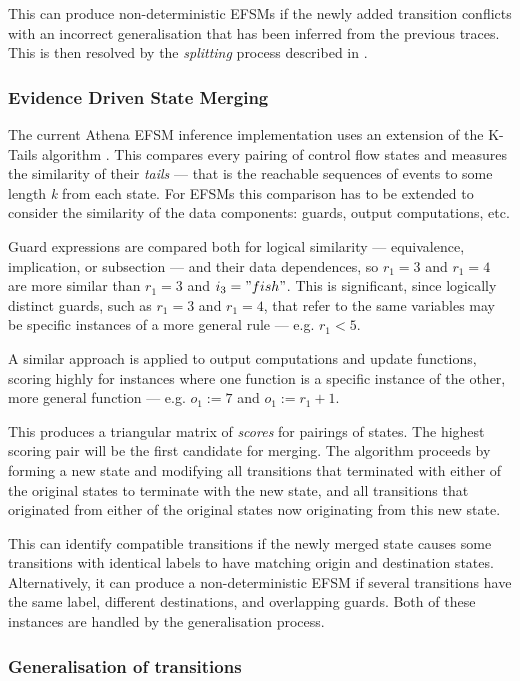 This can produce non-deterministic EFSMs if the newly added transition conflicts with an incorrect generalisation that has been inferred from the previous traces. This is then resolved by the \emph{splitting} process described in .

\subsubsection{Evidence Driven State Merging}
\label{EDSM}

The current Athena EFSM inference implementation uses an extension of the K-Tails algorithm \cite{}. This compares every pairing of control flow states and measures the similarity of their \emph{tails} --- that is the reachable sequences of events to some length \emph{k} from each state. For EFSMs this comparison has to be extended to consider the similarity of the data components: guards, output computations, etc. 

Guard expressions are compared both for logical similarity --- equivalence, implication, or subsection --- and their data dependences, so $r_1 = 3$ and $r_1 = 4$ are more similar than $r_1 = 3$ and $i_3 = "fish"$. This is significant, since logically distinct guards, such as $r_1 = 3$ and $r_1 = 4$, that refer to the same variables may be specific instances of a more general rule --- e.g. $r_1 < 5$.

A similar approach is applied to output computations and update functions, scoring highly for instances where one function is a specific instance of the other, more general function --- e.g. $o_1 := 7$ and $o_1 := r_1 + 1$.

This produces a triangular matrix of \emph{scores} for pairings of states. The highest scoring pair will be the first candidate for merging. The algorithm proceeds by forming a new state and modifying all transitions that terminated with either of the original states to terminate with the new state, and all transitions that originated from either of the original states now originating from this new state.

This can identify compatible transitions if the newly merged state causes some transitions with identical labels to have matching origin and destination states. Alternatively, it can produce a non-deterministic EFSM if several transitions have the same label, different destinations, and overlapping guards. Both of these instances are handled by the generalisation process.

\subsubsection{Generalisation of transitions}
\label{Generalisation}

